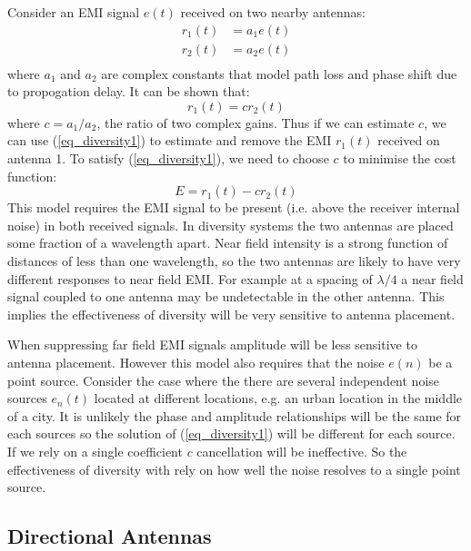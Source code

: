 \documentclass{article}
\begin{document}
Consider an EMI signal $e(t)$ received on two nearby antennas:
\begin{equation}
\begin{split}
r_1(t) &= a_1 e(t) \\
r_2(t) &= a_2 e(t) \\
\end{split}
\end{equation}
where $a_1$ and $a_2$ are complex constants that model path loss and phase shift due to propogation delay. It can be shown that:
\begin{equation} \label{eq_diversity1}
r_1(t) = cr_2(t)
\end{equation}
where $c=a_1/a_2$, the ratio of two complex gains.  Thus if we can estimate $c$, we can use (\ref{eq_diversity1}) to estimate and remove the EMI $r_1(t)$ received on antenna 1. To satisfy (\ref{eq_diversity1}), we need to choose $c$ to minimise the cost function:
\begin{equation} 
E = r_1(t) - cr_2(t)
\end{equation}
This model requires the EMI signal to be present (i.e. above the receiver internal noise) in both received signals. In diversity systems the two antennas are placed some fraction of a wavelength apart. Near field intensity is a strong function of distances of less than one wavelength, so the two antennas are likely to have very different responses to near field EMI. For example at a spacing of $\lambda/4$ a near field signal coupled to one antenna may be undetectable in the other antenna. This implies the effectiveness of diversity will be very sensitive to antenna placement.

When suppressing far field EMI signals amplitude will be less sensitive to antenna placement. However this model also requires that the noise $e(n)$ be a point source.  Consider the case where the there are several independent noise sources $e_n(t)$ located at different locations, e.g. an urban location in the middle of a city.  It is unlikely the phase and amplitude relationships will be the same for each sources so the solution of (\ref{eq_diversity1}) will be different for each source.  If we rely on a single coefficient $c$ cancellation will be ineffective.  So the effectiveness of diversity with rely on how well the noise resolves to a single point source.

\subsection{Directional Antennas}
\end{document}
